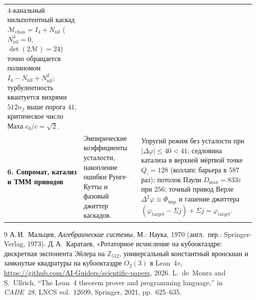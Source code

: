 \documentclass[11pt,a4paper]{article}
\theoremstyle{definition}
\theoremstyle{remark}
\begin{document}
\begin{table}[htbp]
\begin{tabular}{@{}p{}p{}p{}@{}}
$4$-канальный нильпотентный каскад $\mathcal{M}_{\mathrm{chan}} = I_4 + N_{\mathrm{nil}}$ ($N_{\mathrm{nil}}^3=0$, $\det(2\mathcal{M})=24$) точно обращается полиномом $I_4 - N_{\mathrm{nil}} + N_{\mathrm{nil}}^2$; турбулентность квантуется вихрями $512 n_f$ выше порога $41$, критическое число Маха $c_0/c=\sqrt{2}$. \\
\addlinespace[3pt]
\textbf{6. Сопромат, катализ и ТММ приводов} &
Эмпирические коэффициенты усталости, накопление ошибки Рунге--Кутты и фазовый джиттер каскадов. &
Упругий режим без усталости при $|\Delta\varphi|\le 40 < 41$; седловина катализа в верхней мёртвой точке $Q_\square=128$ (коллапс барьера в $587$ раз); потолок Паули $D_{\max}=833\varepsilon$ при $256$; точный привод Верле $\Delta^2\varphi\equiv\Phi_{\mathrm{imp}}$ и гашение джиттера $(\varphi_{\mathrm{target}}-\Sigma j)+\Sigma j = \varphi_{\mathrm{target}}$. \\
\bottomrule
\end{tabular}
\end{table}

\begin{thebibliography}{9}
А.\,И.~Мальцев, \emph{Алгебраические системы}, М.: Наука, 1970 (англ.\ пер.: Springer-Verlag, 1973).
Д.\,А.~Каратаев, «Ротаторное исчисление на кубооктаэдре: дискретная экспонента Эйлера на $\mathbb{Z}_{512}$, универсальный константный вронскиан и замкнутые квадратуры на кубооктаэдре $O_2(3)$ в Lean~4», \url{https://github.com/AI-Guiders/scientific-papers}, 2026.
L.~de~Moura and S.~Ullrich, ``The Lean~4 theorem prover and programming language,'' in \emph{CADE~28}, LNCS vol.~12699, Springer, 2021, pp.~625--635.
\end{thebibliography}
\end{document}
